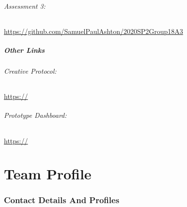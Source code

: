 \documentclass[11pt, oneside, a4paper, titlepage]{article}
\begin{document}
\paragraph{Assessment 3:}\url{https://github.com/SamuelPaulAshton/2020SP2Group18A3}

\subsubsection{Other Links}
\paragraph{Creative Protocol:}\url{https://}
\paragraph{Prototype Dashboard:}\url{https://}

\newpage


\part{Team Profile}

\section{Contact Details And Profiles}

\end{document}
